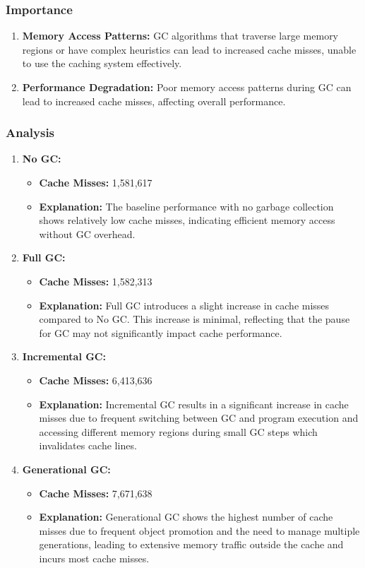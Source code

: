 \documentclass[10pt]{article}
\begin{document}
\subsubsection{Importance}
\begin{enumerate}
  \item \textbf{Memory Access Patterns:} GC algorithms that traverse large memory regions or have complex heuristics can lead to increased cache misses, unable to use the caching system effectively.
  \item \textbf{Performance Degradation:} Poor memory access patterns during GC can lead to increased cache misses, affecting overall performance.
\end{enumerate}

\subsubsection{Analysis}
\begin{enumerate}
  \item \textbf{No GC:} 
  \begin{itemize}
    \item \textbf{Cache Misses:} 1,581,617
    \item \textbf{Explanation:} The baseline performance with no garbage collection shows relatively low cache misses, indicating efficient memory access without GC overhead.
  \end{itemize}

  \item \textbf{Full GC:} 
  \begin{itemize}
    \item \textbf{Cache Misses:} 1,582,313
    \item \textbf{Explanation:} Full GC introduces a slight increase in cache misses compared to No GC. This increase is minimal, reflecting that the pause for GC may not significantly impact cache performance.
  \end{itemize}

  \item \textbf{Incremental GC:} 
  \begin{itemize}
    \item \textbf{Cache Misses:} 6,413,636
    \item \textbf{Explanation:} Incremental GC results in a significant increase in cache misses due to frequent switching between GC and program execution and accessing different memory regions during small GC steps which invalidates cache lines.
  \end{itemize}

  \item \textbf{Generational GC:} 
  \begin{itemize}
    \item \textbf{Cache Misses:} 7,671,638
    \item \textbf{Explanation:} Generational GC shows the highest number of cache misses due to frequent object promotion and the need to manage multiple generations, leading to extensive memory traffic outside the cache and incurs most cache misses.
  \end{itemize}
\end{enumerate}
\end{document}
